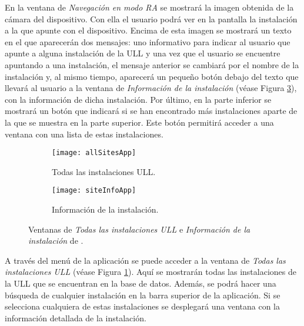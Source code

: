 
En la ventana de \textit{Navegación en modo RA} se mostrará la imagen obtenida de la cámara del dispositivo. Con ella el usuario podrá ver en la pantalla la instalación a la que apunte con el dispositivo. Encima de esta imagen se mostrará un texto en el que aparecerán dos mensajes: uno informativo para indicar al usuario que apunte a alguna instalación de la ULL y una vez que el usuario se encuentre apuntando a una instalación, el mensaje anterior se cambiará por el nombre de la instalación y, al mismo tiempo, aparecerá un pequeño botón debajo del texto que llevará al usuario a la ventana de \textit{Información de la instalación} (véase Figura \ref{fig:siteInfoApp}), con la información de dicha instalación. Por último, en la parte inferior se mostrará un botón que indicará si se han encontrado más instalaciones aparte de la que se muestra en la parte superior. Este botón permitirá acceder a una ventana con una lista de estas instalaciones.

 
\begin{figure}[h]
    \hspace*{\fill}%
    \begin{subfigure}[h]{0.37\linewidth}
    \texttt{[image: allSitesApp]}
    \caption{Todas las instalaciones ULL.}
    \label{fig:allSitesApp}
    \end{subfigure}
    \hfill%
    \begin{subfigure}[h]{0.37\linewidth}
    \texttt{[image: siteInfoApp]}
    \caption{Información de la instalación.}
    \label{fig:siteInfoApp}
    \end{subfigure}%
    \caption{Ventanas de \textit{Todas las instalaciones ULL} e \textit{Información de la instalación} de \textit{\ULLAR{}}.}
    \hspace*{\fill}%
\end{figure}
\bigskip

A través del menú de la aplicación se puede acceder a la ventana de \textit{Todas las instalaciones ULL} (véase Figura \ref{fig:allSitesApp}). Aquí se mostrarán todas las instalaciones de la ULL que se encuentran en la base de datos. Además, se podrá hacer una búsqueda de cualquier instalación en la barra superior de la aplicación. Si se selecciona cualquiera de estas instalaciones se  desplegará una ventana con la información detallada de la instalación.


